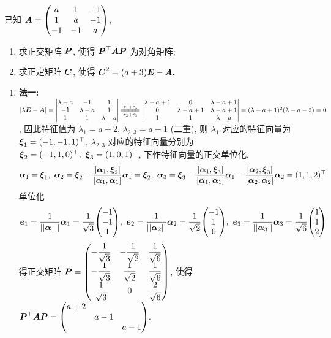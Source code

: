 \begin{example}[2019 数一]
    已知 $\vb*{A}=\mqty(a&1&-1\\1&a&-1\\-1&-1&a)$, 
    \begin{enumerate}[label=(\arabic{*})]
        \item 求正交矩阵 $\vb*{P}$, 使得 $\vb*{P}^\top\vb*{AP}$ 为对角矩阵;
        \item 求正定矩阵 $\vb*{C}$, 使得 $\vb*{C}^2=(a+3)\vb*{E}-\vb*{A}.$
    \end{enumerate}
\end{example}
\begin{solution}
    \begin{enumerate}[label=(\arabic{*})]
        \item \textbf{法一: }$|\lambda\vb*{E}-\vb*{A}|=\mqty|\lambda-a&-1&1\\-1&\lambda-a&1\\1&1&\lambda-a|\xlongequal[r_2+r_3]{r_1+r_3}\mqty|\lambda-a+1&0&\lambda-a+1\\0&\lambda-a+1&\lambda-a+1\\1&1&\lambda-a|=(\lambda-a+1)^2(\lambda-a-2)=0$, 
        因此特征值为 $\lambda_1=a+2$, $\lambda_{2,3}=a-1$ (二重), 则 $\lambda_1$ 对应的特征向量为 $\vb*{\xi}_1=(-1,-1,1)^\top$, $\lambda_{2,3}$ 对应的特征向量分别为 $\vb*{\xi}_2=(-1,1,0)^\top,~\vb*{\xi}_3=(1,0,1)^\top$, 下作特征向量的正交单位化, 
        $$\vb*{\alpha}_1=\vb*{\xi}_1,~\vb*{\alpha}_2=\vb*{\xi}_2-\dfrac{\qty[\vb*{\alpha}_1,\vb*{\xi}_2]}{\qty[\vb*{\alpha}_1,\vb*{\alpha}_1]}\vb*{\alpha}_1=\vb*{\xi}_2,~\vb*{\alpha}_3=\vb*{\xi}_3-\dfrac{\qty[\vb*{\alpha}_1,\vb*{\xi}_3]}{\qty[\vb*{\alpha}_1,\vb*{\alpha}_1]}\vb*{\alpha}_1-\dfrac{\qty[\vb*{\alpha}_2,\vb*{\xi}_3]}{\qty[\vb*{\alpha}_2,\vb*{\alpha}_2]}\vb*{\alpha}_2=(1,1,2)^\top$$
        单位化 $$\vb*{e}_1=\dfrac{1}{||\vb*{\alpha}_1||}\vb*{\alpha}_1=\dfrac{1}{\sqrt{3}}\mqty(-1\\-1\\1),~\vb*{e}_2=\dfrac{1}{||\vb*{\alpha}_2||}\vb*{\alpha}_2=\dfrac{1}{\sqrt{2}}\mqty(-1\\1\\0),~\vb*{e}_3=\dfrac{1}{||\vb*{\alpha}_3||}\vb*{\alpha}_3=\dfrac{1}{\sqrt{6}}\mqty(1\\1\\2)$$
        得正交矩阵 $\vb*{P}=\mqty(-\dfrac{1}{\sqrt{3}}&-\dfrac{1}{\sqrt{2}}&\dfrac{1}{\sqrt{6}}\\[6pt]-\dfrac{1}{\sqrt{3}}&\dfrac{1}{\sqrt{2}}&\dfrac{1}{\sqrt{6}}\\[6pt]\dfrac{1}{\sqrt{3}}&0&\dfrac{2}{\sqrt{6}})$, 使得 $\vb*{P}^\top\vb*{AP}=\mqty(a+2\\&a-1\\&&a-1).$\\

\end{enumerate}
\end{solution}
